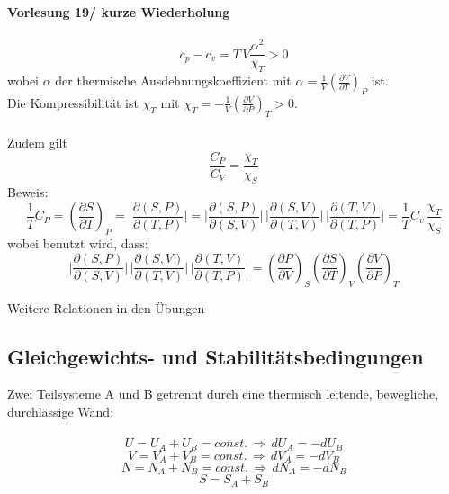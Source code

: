 \documentclass[a4paper,11pt]{scrartcl}
\begin{document}
\textbf{Vorlesung 19/ kurze Wiederholung}\\
\\
\begin{equation}
 c_p - c_v = T\, V \frac{\alpha ^2}{\chi_T} > 0 
\end{equation}
wobei $\alpha $ der thermische Ausdehnungskoeffizient mit $\alpha = \frac{1}{V} \left( \frac{\partial V}{ \partial T } \right)_P$ ist. \\
Die Kompressibilität ist $\chi_T$ mit $\chi_T =  -\frac{1}{V} \left( \frac{\partial V}{\partial P} \right)_T > 0$.\\
\\
Zudem gilt $$ \frac{C_P}{C_V} = \frac{\chi_T}{\chi_S}$$
Beweis: \\
\begin{equation}
 \frac{1}{T} C_P = \left( \frac{\partial S}{ \partial T} \right)_P = \biggl| \frac{\partial (S,P)}{\partial (T,P)} \biggl| = \biggl| \frac{\partial (S,P)}{\partial (S,V)} \biggl| \, \biggl| \frac{\partial (S,V)}{\partial (T,V)} \biggl| \, \biggl| \frac{\partial (T,V)}{\partial (T,P)} \biggl|   =  \frac{1}{T} C_v \, \frac{\chi_T}{\chi_S}
\end{equation}
wobei benutzt wird, dass: 
\begin{equation}
 \biggl| \frac{\partial (S,P)}{\partial (S,V)} \biggl| \, \biggl| \frac{\partial (S,V)}{\partial (T,V)} \biggl| \, \biggl| \frac{\partial (T,V)}{\partial (T,P)} \biggl| = \left( \frac{\partial P}{\partial V} \right)_S  \left( \frac{\partial S}{\partial T} \right)_V  \left( \frac{\partial V}{\partial P} \right)_T
\end{equation}

Weitere Relationen in den Übungen
\subsection{ Gleichgewichts- und Stabilitätsbedingungen}
Zwei Teilsysteme A und B getrennt durch eine thermisch leitende, bewegliche, durchlässige Wand:\\
\\
\begin{equation}
 U = U_A + U_B = const. \, \Rightarrow \, dU_A = -dU_B 
\end{equation}
\begin{equation}
 V = V_A + V_B = const. \, \Rightarrow \, dV_A = -dV_B 
\end{equation}
\begin{equation}
 N = N_A + N_B = const. \, \Rightarrow \, dN_A = -dN_B 
\end{equation}
\begin{equation}
S = S_A + S_B
\end{equation}
\end{document}
